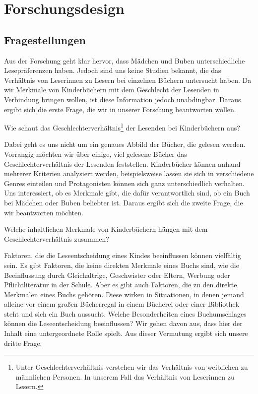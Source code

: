 \chapter{Forschungsdesign}

\section{Fragestellungen}

Aus der Forschung geht klar hervor, dass Mädchen und Buben
unterschiedliche Lesepräferenzen haben. Jedoch sind uns keine Studien
bekannt, die das Verhältnis von Leserinnen zu Lesern bei einzelnen
Büchern untersucht haben. Da wir Merkmale von Kinderbüchern mit dem
Geschlecht der Lesenden in Verbindung bringen wollen, ist diese
Information jedoch unabdingbar. Daraus ergibt sich die erste Frage, die
wir in unserer Forschung beantworten wollen.

\begin{frage}\label{fra:andere} Wie schaut das Geschlechterverhältnis\footnote{Unter Geschlechterverhältnis verstehen wir das Verhältnis von weiblichen zu männlichen Personen. In unserem Fall das Verhältnis von Leserinnen zu Lesern.} der Lesenden bei Kinderbüchern aus? \end{frage}

Dabei geht es uns nicht um ein genaues Abbild der Bücher, die gelesen
werden. Vorrangig möchten wir über einige, viel gelesene Bücher das
Geschlechterverhältnis der Lesenden feststellen. Kinderbücher können
anhand mehrerer Kriterien analysiert werden, beispielsweise lassen sie
sich in verschiedene Genres einteilen und Protagonisten können sich ganz
unterschiedlich verhalten. Uns interessiert, ob es Merkmale gibt, die
dafür verantwortlich sind, ob ein Buch bei Mädchen oder Buben beliebter
ist. Daraus ergibt sich die zweite Frage, die wir beantworten möchten.

\begin{frage}\label{fra:unterschiede} Welche inhaltlichen Merkmale von Kinderbüchern hängen mit dem Geschlechterverhältnis zusammen? \end{frage}

Faktoren, die die Leseentscheidung eines Kindes beeinflussen können
vielfältig sein. Es gibt Faktoren, die keine direkten Merkmale eines
Buchs sind, wie \zB die Beeinflussung durch Gleichaltrige, Geschwister
oder Eltern, Werbung oder Pflichtliteratur in der Schule. Aber es gibt
auch Faktoren, die zu den direkte Merkmalen eines Buchs gehören. Diese
wirken in Situationen, in denen jemand alleine vor einem großen
Bücherregal in einem Bücherei oder einer Bibliothek steht und sich ein
Buch aussucht. Welche Besonderheiten eines Buchumschlages können die
Leseentscheidung beeinflussen? Wir gehen davon aus, dass hier der Inhalt
eine untergeordnete Rolle spielt. Aus dieser Vermutung ergibt sich
unsere dritte Frage.

